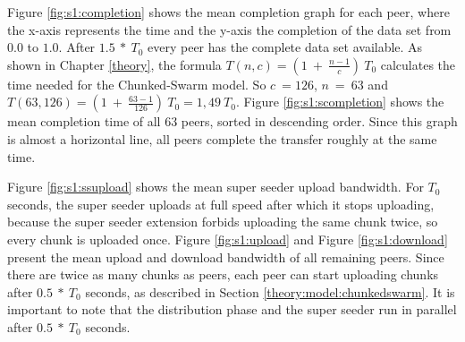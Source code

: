 Figure \ref{fig:s1:completion} shows the mean completion graph for each peer, where the x-axis represents the time and the y-axis the completion of the data set from $0.0$ to $1.0$. After $1.5\:*\:T_0$ every peer has the complete data set available. As shown in Chapter \ref{theory}, the formula $T(n, c) = (1\:+\:\frac{n-1}{c})\:T_0$ calculates the time needed for the Chunked-Swarm model. So $c\:=126$, $n\:=\:63$ and $T(63, 126) = (1\:+\:\frac{63-1}{126})\:T_0 = 1,49\:T_0$. Figure \ref{fig:s1:scompletion} shows the mean completion time of all 63 peers, sorted in descending order. Since this graph is almost a horizontal line, all peers complete the transfer roughly at the same time.

Figure \ref{fig:s1:ssupload} shows the mean super seeder upload bandwidth. For $T_0$ seconds, the super seeder uploads at full speed after which it stops uploading, because the super seeder extension forbids uploading the same chunk twice, so every chunk is uploaded once. Figure \ref{fig:s1:upload} and Figure \ref{fig:s1:download} present the mean upload and download bandwidth of all remaining peers. Since there are twice as many chunks as peers, each peer can start uploading chunks after $0.5\:*\:T_0$ seconds, as described in Section \ref{theory:model:chunkedswarm}. It is important to note that the distribution phase and the super seeder run in parallel after $0.5\:*\:T_0$ seconds.


 































